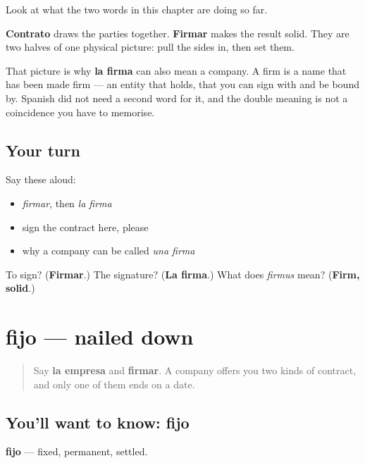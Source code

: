 \begin{culture}
Look at what the two words in this chapter are doing so far.

\textbf{Contrato} draws the parties together. \textbf{Firmar} makes the result solid. They are two halves of one physical picture: pull the sides in, then set them.

That picture is why \textbf{la firma} can also mean a company. A firm is a name that has been made firm — an entity that holds, that you can sign with and be bound by. Spanish did not need a second word for it, and the double meaning is not a coincidence you have to memorise.
\end{culture}

\subsection*{Your turn}
Say these aloud:

\begin{itemize}
\raggedright
  \item \emph{firmar}, then \emph{la firma}
  \item sign the contract here, please
  \item why a company can be called \emph{una firma}
\end{itemize}

\begin{tcolorbox}[breakable,colback=teal!4,colframe=teal!35!black,title={Before you move on}]
To sign? (\textbf{Firmar}.) The signature? (\textbf{La firma}.) What does \emph{firmus} mean? (\textbf{Firm, solid}.)
\end{tcolorbox}
\section[fijo]{fijo — nailed down}

\label{lesson:ES-C441-fijo}



\begin{quote}
Say \textbf{la empresa} and \textbf{firmar}. A company offers you two kinds of contract, and only one of them ends on a date.
\end{quote}

\subsection*{You'll want to know: fijo}
\textbf{fijo} — fixed, permanent, settled.


